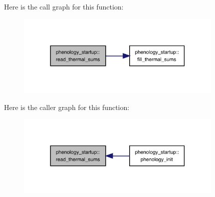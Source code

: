 Here is the call graph for this function\+:
\nopagebreak
\begin{figure}[H]
\begin{center}
\leavevmode
\includegraphics[width=281pt]{namespacephenology__startup_aca2b4422c059ad87aee0f7aa7f7c8964_cgraph}
\end{center}
\end{figure}
Here is the caller graph for this function\+:
\nopagebreak
\begin{figure}[H]
\begin{center}
\leavevmode
\includegraphics[width=281pt]{namespacephenology__startup_aca2b4422c059ad87aee0f7aa7f7c8964_icgraph}
\end{center}
\end{figure}
